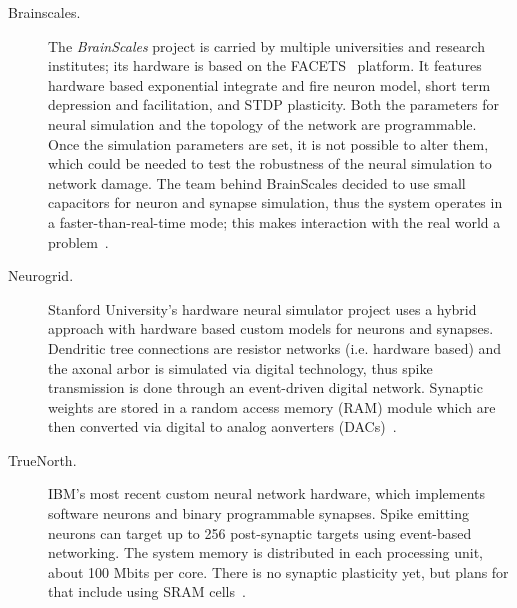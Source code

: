 \begin{description}
  

\item[Brainscales.] The \emph{BrainScales} project is carried by multiple universities and research institutes; its hardware is based on the FACETS~ platform\cite{brainscales-schemmel2010wafer}. It features hardware based exponential integrate and fire neuron model, short term depression and facilitation, and STDP plasticity. Both the parameters for neural simulation and the topology of the network are programmable. Once the simulation parameters are set, it is not possible to alter them, which could be needed to test the robustness of the neural simulation to network damage. The team behind BrainScales decided to use small capacitors for neuron and synapse simulation, thus the system operates in a faster-than-real-time mode; this makes interaction with the real world a problem~\cite{neuro-platforms-summary-7159144,brainscales-homepage}. 

\item[Neurogrid.] Stanford University's hardware neural simulator project uses a hybrid approach with hardware based custom models for neurons and synapses. Dendritic tree connections are resistor networks (i.e. hardware based) and the axonal arbor is simulated via  digital technology, thus spike transmission is done through an event-driven digital network. Synaptic weights are stored in a random access memory (RAM) module which are then converted via  digital to analog aonverters (DACs)~\cite{neurogrid-6805187}. 

\item[TrueNorth.] IBM's most recent custom neural network hardware, which implements software neurons and binary programmable synapses. Spike emitting neurons can target up to 256 post-synaptic targets using event-based networking. The system memory is distributed in each processing unit, about 100 Mbits per core. There is no synaptic plasticity yet, but plans for that include using SRAM cells~\cite{truenorth-web}. 


\end{description}

